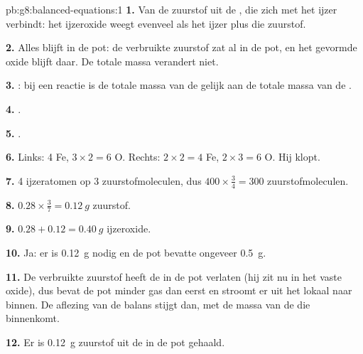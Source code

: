 \begin{solution}{pb:g8:balanced-equations:1}
\textbf{1.} Van de zuurstof uit de , die zich met het ijzer
verbindt: het ijzeroxide weegt evenveel als het ijzer plus die zuurstof.

\textbf{2.} Alles blijft in de pot: de verbruikte zuurstof zat al in de
pot, en het gevormde oxide blijft daar. De totale massa verandert niet.

\textbf{3.} : bij een reactie is de totale massa van de
 gelijk aan de totale massa van de .

\textbf{4.} .

\textbf{5.} .

\textbf{6.} Links: 4 Fe, $3 \times 2 = 6$ O. Rechts: $2 \times 2 = 4$ Fe,
$2 \times 3 = 6$ O. Hij klopt.

\textbf{7.} 4 ijzeratomen op 3 zuurstofmoleculen, dus $400 \times
\frac{3}{4} = 300$ zuurstofmoleculen.

\textbf{8.} $0.28 \times \frac{3}{7} = \qty{0.12}{g}$ zuurstof.

\textbf{9.} $0.28 + 0.12 = \qty{0.40}{g}$ ijzeroxide.

\textbf{10.} Ja: er is \qty{0.12}{g} nodig en de pot bevatte ongeveer
\qty{0.5}{g}.

\textbf{11.} De verbruikte zuurstof heeft de  in de pot verlaten
(hij zit nu in het vaste oxide), dus bevat de pot minder gas dan eerst
en stroomt er  uit het lokaal naar binnen. De aflezing van de
balans stijgt dan, met de massa van de  die binnenkomt.

\textbf{12.} Er is \qty{0.12}{g} zuurstof uit de  in de pot
gehaald.
\end{solution}
